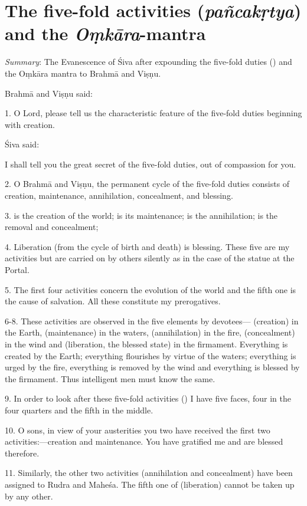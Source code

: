 \chapter{The five-fold activities (\emph{pañcakṛtya}) and the \emph{Oṃkāra}-mantra}

\emph{Summary}: The Evanescence of Śiva after expounding the five-fold duties
() and the Oṃkāra mantra to Brahmā and Viṣṇu.

Brahmā and Viṣṇu said:

1. O Lord, please tell us the characteristic feature of the five-fold duties
beginning with creation.

Śiva said:

I shall tell you the great secret of the five-fold duties, out of compassion
for you.

2. O Brahmā and Viṣṇu, the permanent cycle of the five-fold duties consists of
creation, maintenance, annihilation, concealment, and blessing.

3.  is the creation of the world;  is its maintenance;
 is the annihilation;  is the removal and concealment;

4. Liberation (from the cycle of birth and death) is blessing. These five are my
activities but are carried on by others silently as in the case of the statue
at the Portal.

5. The first four activities concern the evolution of the world and the fifth
one is the cause of salvation. All these constitute my prerogatives.

6-8. These activities are observed in the five elements by devotees—
(creation) in the Earth,  (maintenance) in the waters, 
(annihilation) in the fire,  (concealment) in the wind and
 (liberation, the blessed state) in the firmament. Everything is
created by the Earth; everything flourishes by virtue of the waters; everything
is urged by the fire, everything is removed by the wind and everything is
blessed by the firmament. Thus intelligent men must know the same.

9. In order to look after these five-fold activities () I have
five faces, four in the four quarters and the fifth in the middle.

10. O sons, in view of your austerities you two have received the first two
activities:—creation and maintenance. You have gratified me and are blessed
therefore.

11. Similarly, the other two activities (annihilation and concealment) have been
assigned to Rudra and Maheśa. The fifth one of  (liberation) cannot
be taken up by any other.

